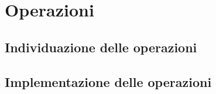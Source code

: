 \chapter{Operazioni}
\section{Individuazione delle operazioni}
\section{Implementazione delle operazioni}
